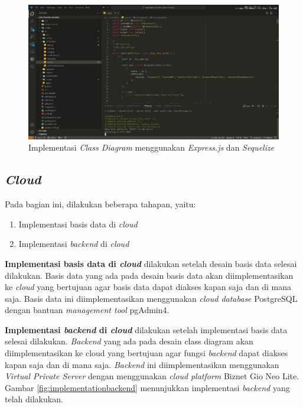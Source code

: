 \begin{figure}[htbp]
  \centering

  \includegraphics[scale=0.45]{gambar/bab3-implementasi-class-diagram.jpeg}

  \caption{Implementasi \emph{Class Diagram} menggunakan \emph{Express.js} dan \emph{Sequelize}}
  \label{fig:implementationclassdiagram}
\end{figure}

\subsection{\emph{Cloud}}

Pada bagian ini, dilakukan beberapa tahapan, yaitu:
\begin{enumerate}[nolistsep]
  \item Implementasi basis data di \emph{cloud}
  \item Implementasi \emph{backend} di \emph{cloud}
\end{enumerate}

\textbf{Implementasi basis data di \emph{cloud}} dilakukan setelah desain basis data selesai dilakukan. Basis data yang ada pada desain basis data akan diimplementasikan ke \emph{cloud} yang bertujuan agar basis data dapat diakses kapan saja dan di mana saja. Basis data ini diimplementasikan menggunakan \emph{cloud database} PostgreSQL dengan bantuan \emph{management tool} pgAdmin4.

\textbf{Implementasi \emph{backend} di \emph{cloud}} dilakukan setelah implementasi basis data selesai dilakukan. \emph{Backend} yang ada pada desain class diagram akan diimplementasikan ke cloud yang bertujuan agar fungsi \emph{backend} dapat diakses kapan saja dan di mana saja. \emph{Backend} ini diimplementasikan menggunakan \emph{Virtual Private Server} dengan menggunakan \emph{cloud} \emph{platform} Biznet Gio Neo Lite. Gambar \ref{fig:implementationbackend} menunjukkan implementasi \emph{backend} yang telah dilakukan.

